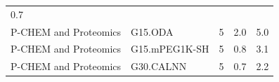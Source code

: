 \documentclass[utf8]{frontiersHLTH} %
\begin{document}
\begin{longtable}[]{@{}lllll@{}}
\begin{minipage}[t]{0.08\columnwidth}
0.7\strut
\end{minipage}\tabularnewline
\begin{minipage}[t]{0.26\columnwidth}\raggedright\strut
P-CHEM and Proteomics\strut
\end{minipage} & \begin{minipage}[t]{0.21\columnwidth}\raggedright\strut
G15.ODA\strut
\end{minipage} & \begin{minipage}[t]{0.06\columnwidth}\raggedright\strut
5\strut
\end{minipage} & \begin{minipage}[t]{0.15\columnwidth}\raggedright\strut
2.0\strut
\end{minipage} & \begin{minipage}[t]{0.08\columnwidth}\raggedright\strut
5.0\strut
\end{minipage}\tabularnewline
\begin{minipage}[t]{0.26\columnwidth}\raggedright\strut
P-CHEM and Proteomics\strut
\end{minipage} & \begin{minipage}[t]{0.21\columnwidth}\raggedright\strut
G15.mPEG1K-SH\strut
\end{minipage} & \begin{minipage}[t]{0.06\columnwidth}\raggedright\strut
5\strut
\end{minipage} & \begin{minipage}[t]{0.15\columnwidth}\raggedright\strut
0.8\strut
\end{minipage} & \begin{minipage}[t]{0.08\columnwidth}\raggedright\strut
3.1\strut
\end{minipage}\tabularnewline
\begin{minipage}[t]{0.26\columnwidth}\raggedright\strut
P-CHEM and Proteomics\strut
\end{minipage} & \begin{minipage}[t]{0.21\columnwidth}\raggedright\strut
G30.CALNN\strut
\end{minipage} & \begin{minipage}[t]{0.06\columnwidth}\raggedright\strut
5\strut
\end{minipage} & \begin{minipage}[t]{0.15\columnwidth}\raggedright\strut
0.7\strut
\end{minipage} & \begin{minipage}[t]{0.08\columnwidth}\raggedright\strut
2.2\strut
\end{minipage}\tabularnewline

\end{longtable}
\end{document}
